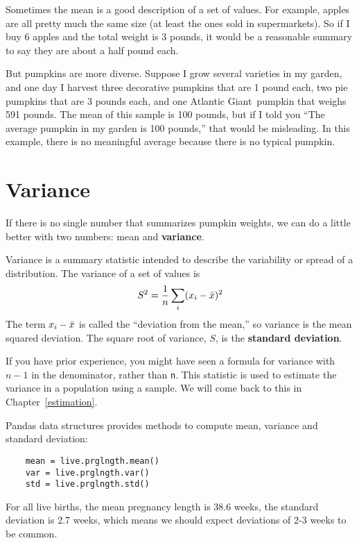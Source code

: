Sometimes the mean is a good description of a set of values.  For
example, apples are all pretty much the same size (at least the ones
sold in supermarkets).  So if I buy 6 apples and the total weight is 3
pounds, it would be a reasonable summary to say they are about a half
pound each.

But pumpkins are more diverse.  Suppose I grow several varieties in my
garden, and one day I harvest three decorative pumpkins that are 1
pound each, two pie pumpkins that are 3 pounds each, and one Atlantic
Giant\textregistered~pumpkin that weighs 591 pounds.  The mean of this
sample is 100 pounds, but if I told you ``The average pumpkin in my
garden is 100 pounds,'' that would be misleading.  In this example,
there is no meaningful average because there is no typical pumpkin.



\section{Variance}

If there is no single number that summarizes pumpkin weights,
we can do a little better with two numbers: mean and {\bf variance}.

Variance is a summary statistic intended to describe the variability
or spread of a distribution.  The variance of a set of values is
%
\[ S^2 = \frac{1}{n} \sum_i (x_i - \bar{x})^2 \]
%
The term $x_i - \bar{x}$ is called the ``deviation from the mean,'' so
variance is the mean squared deviation.  The square root of variance,
$S$, is the {\bf standard deviation}.  

If you have prior experience, you might have seen a formula for
variance with $n-1$ in the denominator, rather than {\tt n}.  This
statistic is used to estimate the variance in a population using a
sample.  We will come back to this in Chapter~\ref{estimation}.

Pandas data structures provides methods to compute mean, variance and
standard deviation:

\begin{verbatim}
    mean = live.prglngth.mean()
    var = live.prglngth.var()
    std = live.prglngth.std()
\end{verbatim}

For all live births, the mean pregnancy length is 38.6 weeks, the
standard deviation is 2.7 weeks, which means we should expect
deviations of 2-3 weeks to be common.


